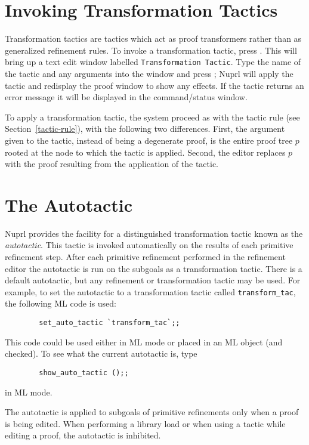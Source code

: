 \section{Invoking Transformation Tactics}

Transformation tactics are tactics which act as proof transformers
rather than as generalized refinement rules.
To invoke a transformation{} tactic,
press \TRANSFORM.
This will bring up a text edit window labelled
{\tt Transformation Tactic}.
Type the name of the tactic and any arguments into the window and press
\EXIT;
Nuprl will apply the tactic and redisplay the proof window to show any
effects.
If the tactic returns an error message it will be displayed in the
command/status window.

To apply a transformation tactic, the system proceed as with the
tactic rule (see Section~\ref{tactic-rule}), with the following two
differences.  First, the argument given to the tactic, instead of
being a degenerate proof, is the entire proof tree $p$ rooted at the
node to which the tactic is applied.  Second, the editor replaces $p$
with the proof resulting from the application of the tactic.



\section{The Autotactic}
Nuprl provides the facility for
a distinguished transformation tactic known as the {\em autotactic}.
This tactic is invoked automatically on the results of each primitive
refinement step.  After each primitive
refinement performed in the refinement editor
the autotactic is run on the subgoals as a transformation
tactic.  There is a default autotactic, but any refinement or
transformation tactic may be used.  For example, to set the autotactic to
a transformation tactic called {\tt transform\_tac}, the following ML code
is used:
\begin{verbatim}
        set_auto_tactic `transform_tac`;;
\end{verbatim}
This code could be used either in ML mode or placed
in an ML object (and checked).  To see what the current autotactic is,
type 
\begin {verbatim}
        show_auto_tactic ();;
\end{verbatim}
in ML mode.

The autotactic is applied to subgoals of primitive refinements only when a
proof is being edited.  When performing a library load or when using a
tactic while editing a proof, the autotactic is inhibited.


